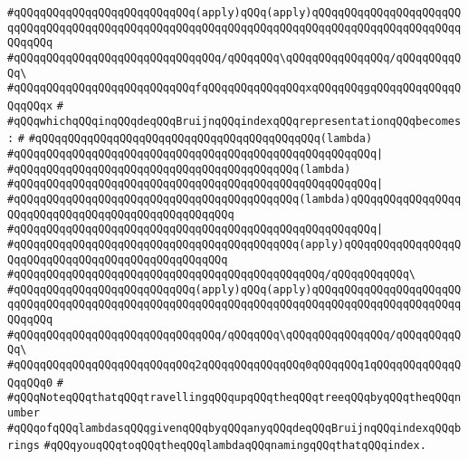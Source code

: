 \verb|#qQQqqQQqqQQqqQQqqQQqqQQqqQQq(apply)qQQq(apply)qQQqqQQqqQQqqQQqqQQqqQQqqQQqqQQqqQQqqQQqqQQqqQQqqQQqqQQqqQQqqQQqqQQqqQQqqQQqqQQqqQQqqQQqqQQqqQQqqQQq|\newline
\verb|#qQQqqQQqqQQqqQQqqQQqqQQqqQQqqQQq/qQQqqQQq\qQQqqQQqqQQqqQQq/qQQqqQQqqQQq\|\newline
\verb|#qQQqqQQqqQQqqQQqqQQqqQQqqQQqfqQQqqQQqqQQqqQQqxqQQqqQQqgqQQqqQQqqQQqqQQqqQQqx|\newline
\verb|#|\newline
\verb|#qQQqwhichqQQqinqQQqdeqQQqBruijnqQQqindexqQQqrepresentationqQQqbecomes:|\newline
\verb|#|\newline
\verb|#qQQqqQQqqQQqqQQqqQQqqQQqqQQqqQQqqQQqqQQqqQQq(lambda)|\newline
\verb|#qQQqqQQqqQQqqQQqqQQqqQQqqQQqqQQqqQQqqQQqqQQqqQQqqQQqqQQq|\verb#|#\newline
\verb|#qQQqqQQqqQQqqQQqqQQqqQQqqQQqqQQqqQQqqQQqqQQq(lambda)|\newline
\verb|#qQQqqQQqqQQqqQQqqQQqqQQqqQQqqQQqqQQqqQQqqQQqqQQqqQQqqQQq|\verb#|#\newline
\verb|#qQQqqQQqqQQqqQQqqQQqqQQqqQQqqQQqqQQqqQQqqQQq(lambda)qQQqqQQqqQQqqQQqqQQqqQQqqQQqqQQqqQQqqQQqqQQqqQQqqQQq|\newline
\verb|#qQQqqQQqqQQqqQQqqQQqqQQqqQQqqQQqqQQqqQQqqQQqqQQqqQQqqQQq|\verb#|#\newline
\verb|#qQQqqQQqqQQqqQQqqQQqqQQqqQQqqQQqqQQqqQQqqQQq(apply)qQQqqQQqqQQqqQQqqQQqqQQqqQQqqQQqqQQqqQQqqQQqqQQqqQQq|\newline
\verb|#qQQqqQQqqQQqqQQqqQQqqQQqqQQqqQQqqQQqqQQqqQQqqQQq/qQQqqQQqqQQq\|\newline
\verb|#qQQqqQQqqQQqqQQqqQQqqQQqqQQq(apply)qQQq(apply)qQQqqQQqqQQqqQQqqQQqqQQqqQQqqQQqqQQqqQQqqQQqqQQqqQQqqQQqqQQqqQQqqQQqqQQqqQQqqQQqqQQqqQQqqQQqqQQqqQQq|\newline
\verb|#qQQqqQQqqQQqqQQqqQQqqQQqqQQqqQQq/qQQqqQQq\qQQqqQQqqQQqqQQq/qQQqqQQqqQQq\|\newline
\verb|#qQQqqQQqqQQqqQQqqQQqqQQqqQQq2qQQqqQQqqQQqqQQq0qQQqqQQq1qQQqqQQqqQQqqQQqqQQq0|\newline
\verb|#|\newline
\verb|#qQQqNoteqQQqthatqQQqtravellingqQQqupqQQqtheqQQqtreeqQQqbyqQQqtheqQQqnumber|\newline
\verb|#qQQqofqQQqlambdasqQQqgivenqQQqbyqQQqanyqQQqdeqQQqBruijnqQQqindexqQQqbrings|\newline
\verb|#qQQqyouqQQqtoqQQqtheqQQqlambdaqQQqnamingqQQqthatqQQqindex.|\newline
